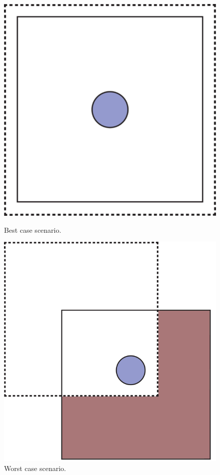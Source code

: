\documentclass{report}
\begin{document}
				\begin{figure}[!h]
					\centering
					\begin{minipage}[b!]{0.35\textwidth}
						\includegraphics[width=\textwidth]{img/area_most.png}
						\caption{Best case scenario.}
						\label{fig:area_most}
					\end{minipage}
					\hfill
					\begin{minipage}[b!]{0.4\textwidth}
						\includegraphics[width=\textwidth]{img/area_least.png}
						\caption{Worst case scenario.}
						\label{fig:area_least}
					\end{minipage}
				\end{figure}
			
\end{document}
